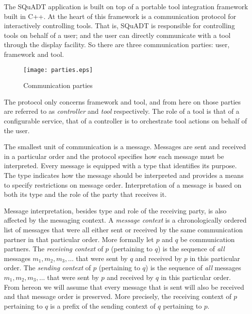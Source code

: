 \documentclass{article}
\newcommand{\squadt}{SQuADT\xspace}
\begin{document}
  The \squadt application is built on top of a portable tool integration
  framework built in C++. At the heart of this framework is a communication
  protocol for interactively controlling tools. That is, \squadt is responsible
  for controlling tools on behalf of a user; and the user can directly
  communicate with a tool through the display facility. So there are three
  communication parties: user, framework and tool.

  \begin{figure}[H]
   \begin{center}
    \texttt{[image: parties.eps]}
   \end{center}
   \vspace{-0.3cm}
   \caption{Communication parties}
  \end{figure}

  The protocol only concerns framework and tool, and from here on those parties
  are referred to as \textit{controller} and \textit{tool} respectively.  The
  role of a tool is that of a configurable service, that of a controller is to
  orchestrate tool actions on behalf of the user.

  The smallest unit of communication is a message. Messages are sent and
  received in a particular order and the protocol specifies how each message
  must be interpreted. Every message is equipped with a type that identifies
  its purpose.  The type indicates how the message should be interpreted and
  provides a means to specify restrictions on message order. Interpretation of
  a message is based on both its type and the role of the party that receives
  it.

  Message interpretation, besides type and role of the receiving party, is also
  affected by the messaging context.  A \textit{message context} is a
  chronologically ordered list of messages that were all either sent or
  received by the same communication partner in that particular order.  More
  formally let $p$ and $q$ be communication partners. The \textit{receiving
  context} of $p$ (pertaining to $q$) is the sequence of \emph{all} messages
  $m_{1}, m_{2}, m_{3}, \ldots$ that were sent by $q$ and received by $p$ in
  this particular order.  The \textit{sending context} of $p$ (pertaining to
  $q$) is the sequence of \emph{all} messages $m_{1}, m_{2}, m_{3}, \ldots$
  that were sent by $p$ and received by $q$ in this particular order. From
  hereon we will assume that every message that is sent will also be received
  and that message order is preserved. More precisely, the receiving context of
  $p$ pertaining to $q$ is a prefix of the sending context of $q$ pertaining to
  $p$.
\end{document}

